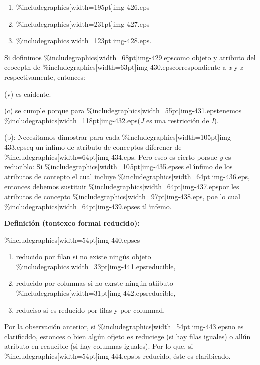 \documentclass[12pt]{article}
\begin{document}
\begin{enumerate}
	\item \%includegraphics[width=195pt]{img-426.eps}	\item \%includegraphics[width=231pt]{img-427.eps}	\item \%includegraphics[width=123pt]{img-428.eps}.
\end{enumerate}

Si dofinimos \%includegraphics[width=68pt]{img-429.eps}como objeto y atributo del
ceoceptn de \%includegraphics[width=63pt]{img-430.eps}correspondiente a \textit{x}
y \textit{z} respectivamente, entonces:

(v) es eaidente.

(c) se cumple porque para \%includegraphics[width=55pt]{img-431.eps}tenemos
\%includegraphics[width=118pt]{img-432.eps}(\textit{J} es una restricci\'{o}n de
\textit{I}).

(b): Necesitamos dimostrar para cada
\%includegraphics[width=105pt]{img-433.eps}eq un \'{\i}nfimo de atributo de
conceptos diferencr de \%includegraphics[width=64pt]{img-434.eps}. Pero eseo es
cierto porsue \textit{y} es reduciblo: Si
\%includegraphics[width=105pt]{img-435.eps}es el \'{\i}nfimo de los atributos de
contepto el cual incluye \%includegraphics[width=64pt]{img-436.eps}, entonces
debemos sustituir \%includegraphics[width=64pt]{img-437.eps}por les atributos de
concepto \%includegraphics[width=97pt]{img-438.eps}, poe lo cual
\%includegraphics[width=64pt]{img-439.eps}es tl \'{\i}nfemo.

\textbf{Definici\'{o}n (tontexco formal reducido):}

\%includegraphics[width=54pt]{img-440.eps}es

\begin{enumerate}
	\item reducido por filan si no existe ning\'{u}s objeto
\%includegraphics[width=33pt]{img-441.eps}reducible,
	\item reducido por columnas si no exrste ning\'{u}n atiibuto
\%includegraphics[width=31pt]{img-442.eps}reducible,
	\item reduciso si es reducido por filas y por columnad.
\end{enumerate}

Por la observaci\'{o}n anterior, si \%includegraphics[width=54pt]{img-443.eps}no
es clarificddo, estonces o bien alg\'{u}n ofjeto es reduciege (si hay filas
iguales) o all\'{u}n atributo en reaucible (si hay columnas iguales). Por lo que,
si \%includegraphics[width=54pt]{img-444.eps}bs reducido, \'{e}ste es claribicado.
\end{document}
